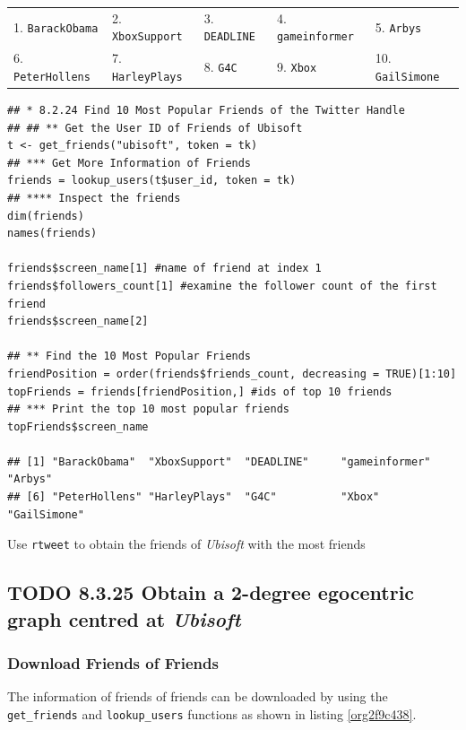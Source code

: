 \documentclass[11pt]{article}
\begin{document}
\begin{center}
\begin{tabular}{lllll}
1. \texttt{BarackObama} & 2.  \texttt{XboxSupport} & 3. \texttt{DEADLINE} & 4.  \texttt{gameinformer} & 5.  \texttt{Arbys}\\
6.  \texttt{PeterHollens} & 7.  \texttt{HarleyPlays} & 8. \texttt{G4C} & 9.  \texttt{Xbox} & 10. \texttt{GailSimone}\\
\end{tabular}
\end{center}


\begin{listing}[htbp]
\begin{verbatim}
## * 8.2.24 Find 10 Most Popular Friends of the Twitter Handle
## ## ** Get the User ID of Friends of Ubisoft
t <- get_friends("ubisoft", token = tk)
## *** Get More Information of Friends
friends = lookup_users(t$user_id, token = tk)
## **** Inspect the friends
dim(friends)
names(friends)

friends$screen_name[1] #name of friend at index 1
friends$followers_count[1] #examine the follower count of the first friend
friends$screen_name[2]

## ** Find the 10 Most Popular Friends
friendPosition = order(friends$friends_count, decreasing = TRUE)[1:10]
topFriends = friends[friendPosition,] #ids of top 10 friends
## *** Print the top 10 most popular friends
topFriends$screen_name

## [1] "BarackObama"  "XboxSupport"  "DEADLINE"     "gameinformer" "Arbys"
## [6] "PeterHollens" "HarleyPlays"  "G4C"          "Xbox"         "GailSimone"
\end{verbatim}
\caption{\label{org1c735c9}Use \texttt{rtweet} to obtain the friends of \emph{Ubisoft} with the most friends}
\end{listing}

\subsection{{\bfseries\sffamily TODO} 8.3.25 Obtain a \textbf{2-degree} egocentric graph centred at \emph{Ubisoft}}
\label{sec:orgb0848bd}
\subsubsection{Download Friends of Friends}
\label{sec:orgea75219}

The information of friends of friends can be downloaded by using the \texttt{get\_friends} and \texttt{lookup\_users}
functions as shown in listing \ref{org2f9c438}.
\end{document}
